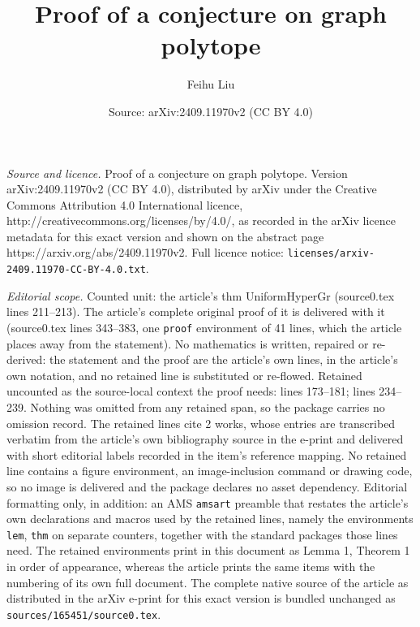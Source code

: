 \documentclass[10pt,a4paper]{amsart}
\title{Proof of a conjecture on graph polytope}
\author{Feihu Liu}
\date{Source: arXiv:2409.11970v2 (CC BY 4.0)}
\begin{document}
\maketitle

\noindent\emph{Source and licence.} Proof of a conjecture on graph polytope. Version arXiv:2409.11970v2 (CC BY 4.0), distributed by arXiv under the Creative Commons Attribution 4.0 International licence, http://creativecommons.org/licenses/by/4.0/, as recorded in the arXiv licence metadata for this exact version and shown on the abstract page https://arxiv.org/abs/2409.11970v2. Full licence notice: \texttt{licenses/arxiv-2409.11970-CC-BY-4.0.txt}.\par\smallskip

\noindent\textit{Editorial scope.} Counted unit: the article's thm UniformHyperGr (source0.tex lines 211--213). The article's complete original proof of it is delivered with it (source0.tex lines 343--383, one \texttt{proof} environment of 41 lines, which the article places away from the statement). No mathematics is written, repaired or re-derived: the statement and the proof are the article's own lines, in the article's own notation, and no retained line is substituted or re-flowed.  Retained uncounted as the source-local context the proof needs: lines 173--181; lines 234--239.  Nothing was omitted from any retained span, so the package carries no omission record.  The retained lines cite 2 works, whose entries are transcribed verbatim from the article's own bibliography source in the e-print and delivered with short editorial labels recorded in the item's reference mapping.  No retained line contains a figure environment, an image-inclusion command or drawing code, so no image is delivered and the package declares no asset dependency.  Editorial formatting only, in addition: an AMS \texttt{amsart} preamble that restates the article's own declarations and macros used by the retained lines, namely the environments \texttt{lem}, \texttt{thm} on separate counters, together with the standard packages those lines need.  The retained environments print in this document as Lemma 1, Theorem 1 in order of appearance, whereas the article prints the same items with the numbering of its own full document.  The complete native source of the article as distributed in the arXiv e-print for this exact version is bundled unchanged as \texttt{sources/165451/source0.tex}.
\end{document}
